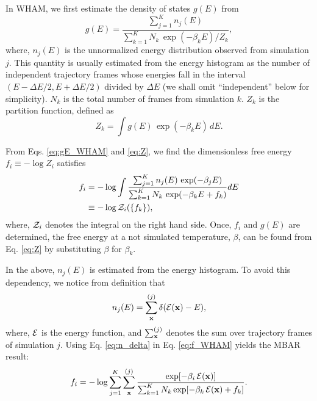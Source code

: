 \documentclass[reprint,superscriptaddress]{revtex4-1}
\begin{document}
In WHAM,
we first estimate the density of states $g(E)$ from
%
\begin{equation}
g(E)
=
\frac{
  \sum_{j = 1}^K n_j(E)
}
{
  \sum_{k = 1}^K N_k \, \exp(-\beta_k E) / Z_k
},
\label{eq:gE_WHAM}
\end{equation}
%
where,
$n_j(E)$
is the unnormalized energy distribution
observed from simulation $j$.
%
This quantity is usually estimated
from the energy histogram as
the number of independent trajectory frames
whose energies fall in the interval
$(E - \Delta E/2, E + \Delta E/2)$
divided by $\Delta E$
(we shall omit ``independent'' below for simplicity).
%
$N_k$
is the total number of frames
from simulation $k$.
%
$Z_k$
is the partition function,
defined as
%
\begin{equation}
Z_k
=
\int g(E) \, \exp(-\beta_k E) \, dE.
\label{eq:Z}
\end{equation}




From Eqs. \eqref{eq:gE_WHAM} and \eqref{eq:Z},
we find the dimensionless free energy
$f_i \equiv -\log Z_i$
satisfies
\begin{align}
f_i
&=
-\log
  \int
    \frac{
      \sum_{j = 1}^K n_j(E) \, \exp(-\beta_j E)
    }
    {
      \sum_{k = 1}^K N_k \, \exp(-\beta_k E + f_k)
    }
    dE
\label{eq:f_WHAM}
\\
&\equiv
-\log \mathcal{Z}_i(\{ f_k \}),
\notag
\end{align}
%
where,
$\mathcal{Z}_i$
denotes the integral on the right hand side.
%
Once, $f_i$ and $g(E)$ are determined,
the free energy at a not simulated temperature, $\beta$,
can be found from Eq. \eqref{eq:Z}
by substituting $\beta$ for $\beta_k$.



In the above,
$n_j(E)$ is estimated from the energy histogram.
%
To avoid this dependency,
we notice from definition that
%
\begin{equation}
n_j(E)
=
\sum_{\mathbf{x}}^{(j)} \delta(\mathcal{E}(\mathbf{x}) - E),
\label{eq:n_delta}
\end{equation}
%
where,
$\mathcal{E}$
is the energy function,
and
$\sum_{\mathbf{x}}^{(j)}$
denotes the sum over trajectory frames
of simulation $j$.
%
%
%
Using Eq. \eqref{eq:n_delta} in Eq. \eqref{eq:f_WHAM} yields
the MBAR\cite{shirts2008} result:
%
\begin{equation}
f_i
=
-\log
\sum_{j = 1}^K
\sum_{\mathbf{x}}^{(j)}
\frac{
  \exp[-\beta_i \, \mathcal{E}(\mathbf{x})]
}
{
  \sum_{k = 1}^K N_k \exp[-\beta_k \, \mathcal{E}(\mathbf{x}) + f_k]
}.
\label{eq:f_MBAR}
\end{equation}
%
\end{document}
